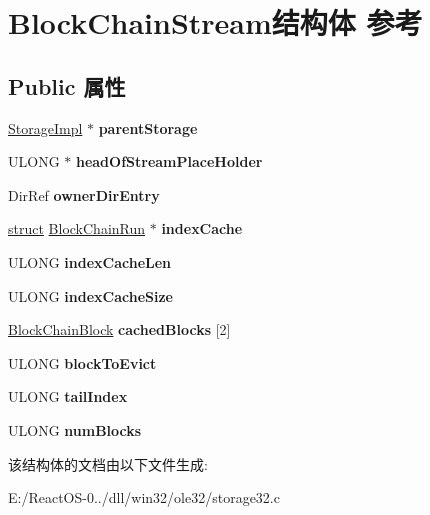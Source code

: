 \hypertarget{struct_block_chain_stream}{}\section{Block\+Chain\+Stream结构体 参考}
\label{struct_block_chain_stream}
\subsection*{Public 属性}
\begin{DoxyCompactItemize}
\item 
\mbox{\label{struct_block_chain_stream_a3e7de9809a18fc17ba3b63b49144876e}} 
\hyperlink{struct_storage_impl}{Storage\+Impl} $\ast$ {\bfseries parent\+Storage}
\item 
\mbox{\label{struct_block_chain_stream_ac0e9c615ab97c68d49eeb56eeed91b7e}} 
U\+L\+O\+NG $\ast$ {\bfseries head\+Of\+Stream\+Place\+Holder}
\item 
\mbox{\label{struct_block_chain_stream_a7f156f2e411164b467560c82291be5a7}} 
Dir\+Ref {\bfseries owner\+Dir\+Entry}
\item 
\mbox{\label{struct_block_chain_stream_a7637a4689030cdfae04a1702b6e5db0c}} 
\hyperlink{interfacestruct}{struct} \hyperlink{struct_block_chain_run}{Block\+Chain\+Run} $\ast$ {\bfseries index\+Cache}
\item 
\mbox{\label{struct_block_chain_stream_a31aa63b008b128349dfd0fa040d38f96}} 
U\+L\+O\+NG {\bfseries index\+Cache\+Len}
\item 
\mbox{\label{struct_block_chain_stream_a114d04f3bd305c2bded4be2eced0319e}} 
U\+L\+O\+NG {\bfseries index\+Cache\+Size}
\item 
\mbox{\label{struct_block_chain_stream_ae45e5090a8f15d84480723bb2ab16b9a}} 
\hyperlink{struct_block_chain_block}{Block\+Chain\+Block} {\bfseries cached\+Blocks} \mbox{[}2\mbox{]}
\item 
\mbox{\label{struct_block_chain_stream_a66493372005d4b257060b3e6ef37253c}} 
U\+L\+O\+NG {\bfseries block\+To\+Evict}
\item 
\mbox{\label{struct_block_chain_stream_a290798c60a58ab11d275f75661fc6e5e}} 
U\+L\+O\+NG {\bfseries tail\+Index}
\item 
\mbox{\label{struct_block_chain_stream_aa5be0d8be0e60fc4a0a0f5cb30452333}} 
U\+L\+O\+NG {\bfseries num\+Blocks}
\end{DoxyCompactItemize}


该结构体的文档由以下文件生成\+:\begin{DoxyCompactItemize}
\item 
E\+:/\+React\+O\+S-\/0../dll/win32/ole32/storage32.\+c\end{DoxyCompactItemize}
